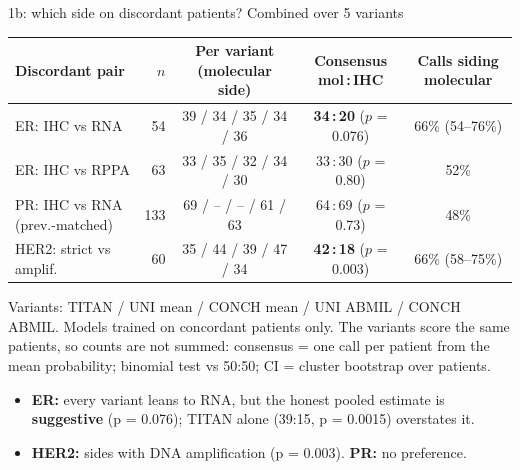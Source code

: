 \documentclass[aspectratio=169,10pt]{beamer}
\begin{document}
\begin{frame}[t]{1b: which side on discordant patients? Combined over 5 variants}
\footnotesize
\centering
\scriptsize
\begin{tabular}{lrccc}
\toprule
Discordant pair & $n$ & Per variant (molecular side) & \textbf{Consensus} mol\,:\,IHC & Calls siding molecular \\
\midrule
ER: IHC vs RNA & 54 & 39 / 34 / 35 / 34 / 36 & \textbf{34\,:\,20} ($p$ = 0.076) & 66\% (54--76\%) \\
ER: IHC vs RPPA & 63 & 33 / 35 / 32 / 34 / 30 & 33\,:\,30 ($p$ = 0.80) & 52\% \\
PR: IHC vs RNA (prev.-matched) & 133 & 69 / -- / -- / 61 / 63 & 64\,:\,69 ($p$ = 0.73) & 48\% \\
HER2: strict vs amplif. & 60 & 35 / 44 / 39 / 47 / 34 & \textbf{42\,:\,18} ($p$ = 0.003) & 66\% (58--75\%) \\
\bottomrule
\end{tabular}

\vspace{2pt}
{\tiny Variants: TITAN / UNI mean / CONCH mean / UNI ABMIL / CONCH ABMIL. Models trained on concordant patients only.
The variants score the same patients, so counts are not summed: consensus = one call per patient from the mean probability;
binomial test vs 50:50; CI = cluster bootstrap over patients.}

\vspace{6pt}
\raggedright
\begin{itemize}
  \item \textbf{ER:} every variant leans to RNA, but the honest pooled estimate is \textbf{suggestive} (p = 0.076);
        TITAN alone (39:15, p = 0.0015) overstates it.
  \item \textbf{HER2:} sides with DNA amplification (p = 0.003). \textbf{PR:} no preference.
\end{itemize}
\end{frame}
\end{document}
